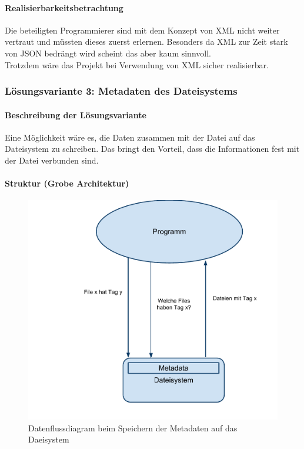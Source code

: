 \documentclass[10pt,paper=a4,final]{scrartcl}
\begin{document}
\paragraph{Realisierbarkeitsbetrachtung}
Die beteiligten Programmierer sind mit dem Konzept von XML nicht weiter vertraut und müssten dieses zuerst erlernen. Besonders da XML zur Zeit stark von JSON bedrängt wird scheint das aber kaum sinnvoll.\\
Trotzdem wäre das Projekt bei Verwendung von XML sicher realisierbar.
\subsubsection{L\"osungsvariante 3: Metadaten des Dateisystems}
\paragraph{Beschreibung der L\"osungsvariante}
Eine Möglichkeit wäre es, die Daten zusammen mit der Datei auf das Dateisystem zu schreiben. Das bringt den Vorteil, dass die Informationen fest mit der Datei verbunden sind.
\paragraph{Struktur (Grobe Architektur)}
  \begin{figure}[h!]
    \includegraphics[width = \textwidth]{datenfluss_meta.pdf}
    \caption{Datenflussdiagram beim Speichern der Metadaten auf das Daeisystem}
  \end{figure}
\end{document}
